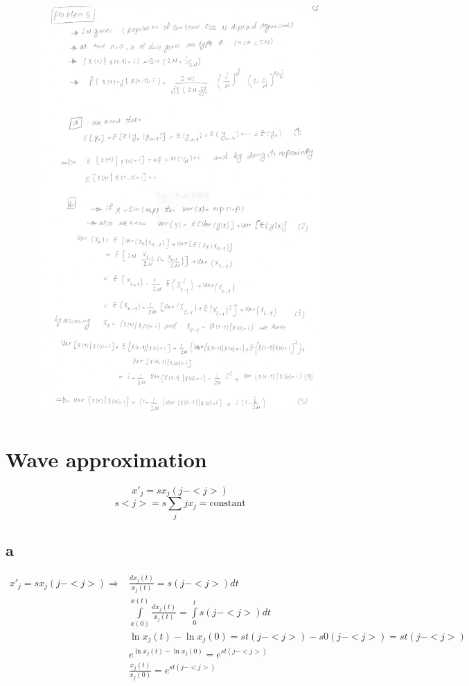 \begin{figure}[htbp]
\centering
\includegraphics[scale=0.8, page=2]{./img/ex5}
\end{figure}
\newpage


\setcounter{chapter}{6}
\setcounter{section}{0}
\section{Wave approximation}
\[ x'_j = sx_j (j-<j>)  \]
\[ s<j> = s\sum\limits_{j}jx_j = \text{constant} \]

\subsection{a}

\begin{align*}
 x'_j = sx_j(j-<j>)	\Rightarrow & \frac{dx_j(t)}{x_j(t)} = s(j-<j>)dt\\
& \int\limits_{x(0)}^{x(t)} \frac{dx_j(t)}{x_j(t)} = \int\limits_{0}^{t} s(j-<j>)dt\\
& \ln x_j(t) - \ln x_j(0) = st(j-<j>) -s0(j-<j>) = st(j-<j>)\\
& e^{\ln x_j(t)- \ln x_j(0)} = e^{st(j-<j>)}\\
& \frac{x_j(t)}{x_j(0)} = e^{st(j-<j>)}
\end{align*}


